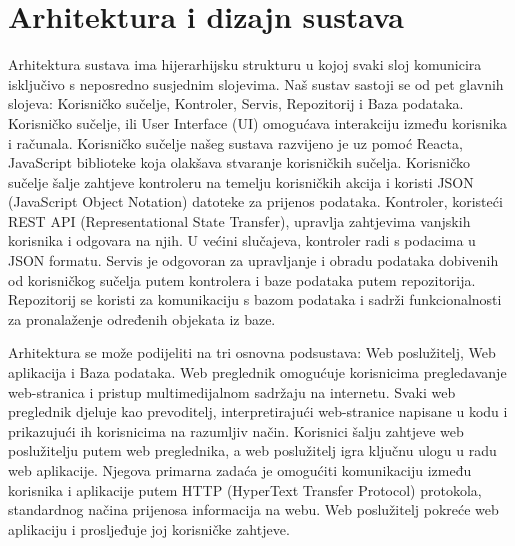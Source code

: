 

\chapter{Arhitektura i dizajn sustava}
		
		 Arhitektura sustava ima hijerarhijsku strukturu u kojoj svaki sloj komunicira isključivo s neposredno susjednim slojevima. Naš sustav sastoji se od pet glavnih slojeva: Korisničko sučelje, Kontroler, Servis, Repozitorij i Baza podataka. Korisničko sučelje, ili User Interface (UI) omogućava interakciju između korisnika i računala. Korisničko sučelje našeg sustava razvijeno je uz pomoć Reacta, JavaScript biblioteke koja olakšava stvaranje korisničkih sučelja. Korisničko sučelje šalje zahtjeve kontroleru na temelju korisničkih akcija i koristi JSON (JavaScript Object Notation) datoteke za prijenos podataka. Kontroler, koristeći REST API (Representational State Transfer), upravlja zahtjevima vanjskih korisnika i odgovara na njih. U većini slučajeva, kontroler radi s podacima u JSON formatu. Servis je odgovoran za upravljanje i obradu podataka dobivenih od korisničkog sučelja putem kontrolera i baze podataka putem repozitorija. Repozitorij se koristi za komunikaciju s bazom podataka i sadrži funkcionalnosti za pronalaženje određenih objekata iz baze.	

		Arhitektura se može podijeliti na tri osnovna podsustava: Web poslužitelj, Web aplikacija i Baza podataka. Web preglednik omogućuje korisnicima pregledavanje web-stranica i pristup multimedijalnom sadržaju na internetu. Svaki web preglednik djeluje kao prevoditelj, interpretirajući web-stranice napisane u kodu i prikazujući ih korisnicima na razumljiv način. Korisnici šalju zahtjeve web poslužitelju putem web preglednika, a web poslužitelj igra ključnu ulogu u radu web aplikacije. Njegova primarna zadaća je omogućiti komunikaciju između korisnika i aplikacije putem HTTP (HyperText Transfer Protocol) protokola, standardnog načina prijenosa informacija na webu. Web poslužitelj pokreće web aplikaciju i prosljeđuje joj korisničke zahtjeve.

